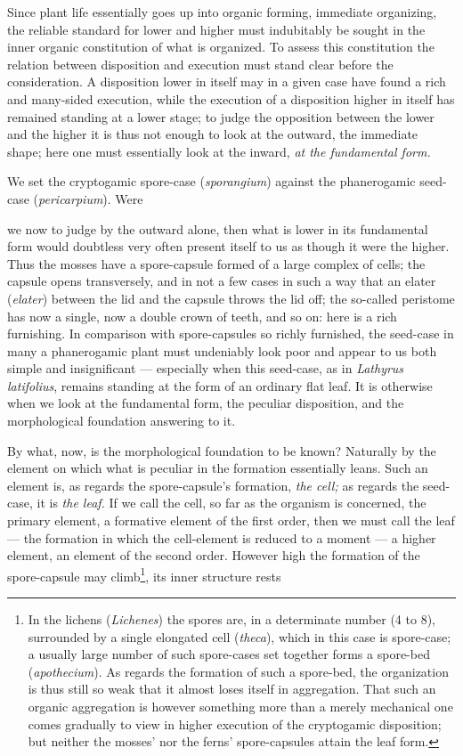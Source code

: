 \documentclass[12pt,a4paper]{book}
\begin{document}
Since plant life essentially goes up into organic forming, immediate organizing,
the reliable standard for lower and higher must indubitably be sought in the inner
organic constitution of what is organized. To assess this constitution the
relation between disposition and execution must stand clear before the
consideration. A disposition lower in itself may in a given case have found a rich
and many-sided execution, while the execution of a disposition higher in itself
has remained standing at a lower stage; to judge the opposition between the lower
and the higher it is thus not enough to look at the outward, the immediate shape;
here one must essentially look at the inward, \emph{at the fundamental form.}

We set the cryptogamic spore-case (\textit{sporangium}) against the phanerogamic
seed-case (\textit{pericarpium}). Were

\setcounter{footnote}{0}
we now to judge by the outward alone, then what is lower in its fundamental form
would doubtless very often present itself to us as though it were the higher.
Thus the mosses have a spore-capsule formed of a large complex of cells; the
capsule opens transversely, and in not a few cases in such a way that an elater
(\textit{elater}) between the lid and the capsule throws the lid off; the
so-called peristome has now a single, now a double crown of teeth, and so on:
here is a rich furnishing. In comparison with spore-capsules so richly furnished,
the seed-case in many a phanerogamic plant must undeniably look poor and appear to
us both simple and insignificant --- especially when this seed-case, as in
\textit{Lathyrus latifolius}, remains standing at the form of an ordinary flat
leaf. It is otherwise when we look at the fundamental form, the peculiar
disposition, and the morphological foundation answering to it.

By what, now, is the morphological foundation to be known? Naturally by the
element on which what is peculiar in the formation essentially leans. Such an
element is, as regards the spore-capsule's formation, \emph{the cell;} as regards
the seed-case, it is \emph{the leaf.} If we call the cell, so far as the organism
is concerned, the primary element, a formative element of the first order, then we
must call the leaf --- the formation in which the cell-element is reduced to a
moment --- a higher element, an element of the second order. However high the
formation of the spore-capsule may climb\footnote{In the lichens
(\textit{Lichenes}) the spores are, in a determinate number (4 to 8), surrounded
by a single elongated cell (\textit{theca}), which in this case is spore-case; a
usually large number of such spore-cases set together forms a spore-bed
(\textit{apothecium}). As regards the formation of such a spore-bed, the
organization is thus still so weak that it almost loses itself in aggregation.
That such an organic aggregation is however something more than a merely
mechanical one comes gradually to view in higher execution of the cryptogamic
disposition; but neither the mosses' nor the ferns' spore-capsules attain the leaf
form.}, its inner structure rests
\end{document}

